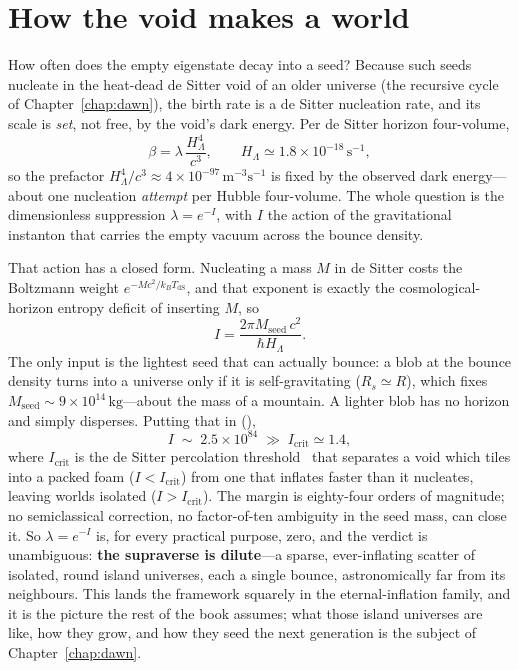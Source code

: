 \section{How the void makes a world}
\label{sec:instanton}

How often does the empty eigenstate decay into a seed? Because such seeds nucleate
in the heat-dead de Sitter void of an older universe (the recursive cycle of
Chapter~\ref{chap:dawn}), the birth rate is a de Sitter nucleation rate, and its
scale is \emph{set}, not free, by the void's dark energy. Per de Sitter horizon
four-volume,
\begin{equation}
  \beta = \lambda\,\frac{H_\Lambda^4}{c^3},
  \qquad H_\Lambda \simeq 1.8\times10^{-18}\,\mathrm{s^{-1}},
  \label{eq:beta}
\end{equation}
so the prefactor $H_\Lambda^4/c^3 \approx 4\times10^{-97}\,\mathrm{m^{-3}s^{-1}}$
is fixed by the observed dark energy---about one nucleation \emph{attempt} per
Hubble four-volume. The whole question is the dimensionless suppression
$\lambda = e^{-I}$, with $I$ the action of the gravitational instanton that
carries the empty vacuum across the bounce density.

That action has a closed form. Nucleating a mass $M$ in de Sitter costs the
Boltzmann weight $e^{-Mc^2/k_B T_{\mathrm{dS}}}$, and that exponent is exactly the
cosmological-horizon entropy deficit of inserting $M$, so
\begin{equation}
  I = \frac{2\pi M_{\mathrm{seed}}\,c^2}{\hbar H_\Lambda}.
  \label{eq:instanton}
\end{equation}
The only input is the lightest seed that can actually bounce: a blob at the bounce
density turns into a universe only if it is self-gravitating ($R_s \simeq R$),
which fixes $M_{\mathrm{seed}} \sim 9\times10^{14}\,\mathrm{kg}$---about the mass
of a mountain. A lighter blob has no horizon and simply disperses. Putting that in
(),
\begin{equation}
  I \;\sim\; 2.5\times10^{84} \;\gg\; I_{\mathrm{crit}} \simeq 1.4 ,
\end{equation}
where $I_{\mathrm{crit}}$ is the de Sitter percolation threshold~\citep{guth1983}
that separates a void which tiles into a packed foam ($I<I_{\mathrm{crit}}$) from
one that inflates faster than it nucleates, leaving worlds isolated
($I>I_{\mathrm{crit}}$). The margin is eighty-four orders of magnitude; no
semiclassical correction, no factor-of-ten ambiguity in the seed mass, can close
it. So $\lambda = e^{-I}$ is, for every practical purpose, zero, and the verdict
is unambiguous: \textbf{the supraverse is dilute}---a sparse, ever-inflating
scatter of isolated, round island universes, each a single bounce, astronomically
far from its neighbours. This lands the framework squarely in the
eternal-inflation family, and it is the picture the rest of the book assumes; what
those island universes are like, how they grow, and how they seed the next
generation is the subject of Chapter~\ref{chap:dawn}.

